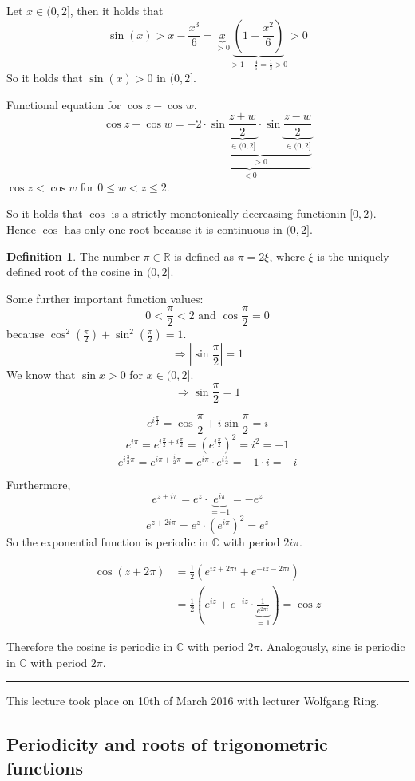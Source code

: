 \documentclass[a4paper,landscape,twocolumn]{article}
\theoremstyle{definition}
\newtheorem{defi}{Definition}
\newcommand\abs[1]{\left|#1\right|}
\newcommand\meta[3]{\hrule{} This #1 took place on #2 with lecturer #3.\par}
\begin{document}
Let $x \in (0,2]$, then it holds that
\[ \sin(x) > x - \frac{x^3}{6} = \underbrace{x}_{>0} \underbrace{\left(1 - \frac{x^2}{6}\right)}_{>1 - \frac46 = \frac13 > 0} > 0 \]
So it holds that $\sin(x) > 0$ in $(0,2]$.

Functional equation for $\cos{z} - \cos{w}$.
\[ \cos{z} - \cos{w} = \underbrace{-2  \cdot \underbrace{\sin{\underbrace{\frac{z+w}{2}}_{\in (0,2]}} \cdot \sin{\underbrace{\frac{z-w}{2}}_{\in (0,2]}}}_{>0}}_{<0} \]
$\cos{z} < \cos{w}$ for $0 \leq w < z \leq 2$.

So it holds that $\cos$ is a strictly monotonically decreasing functionin $[0,2)$. Hence $\cos$ has only one root because it is continuous in $(0,2]$.

\begin{defi}
  The number $\pi \in \mathbb R$ is defined as $\pi = 2\xi$, where $\xi$ is the uniquely defined root of the cosine in $(0,2]$.
\end{defi}

Some further important function values:
\[ 0 < \frac{\pi}{2} < 2 \text{ and } \cos{\frac\pi2} = 0 \]
because $\cos^2\left(\frac\pi2\right) + \sin^2\left(\frac\pi2\right) = 1$.
\[ \Rightarrow \abs{\sin\frac\pi2} = 1 \]
We know that $\sin{x} > 0$ for $x \in (0,2]$.
\[ \Rightarrow \sin\frac\pi2 = 1 \]

\[ e^{i \frac\pi2} = \cos\frac\pi2 + i \sin\frac\pi2 = i \]
\[ e^{i\pi} = e^{i\frac\pi2 + i\frac\pi2} = \left(e^{i\frac\pi2}\right)^2 = i^2 = -1 \]
\[ e^{i \frac32\pi} = e^{i\pi + \frac{i}2 \pi} = e^{i\pi} \cdot e^{i \frac\pi2} = -1 \cdot i = -i \]

Furthermore,
\[ e^{z + i\pi} = e^z \cdot \underbrace{e^{i\pi}}_{=-1} = -e^z \]
\[ e^{z + 2i\pi} = e^z \cdot \left(e^{i\pi}\right)^2 = e^z \]
So the exponential function is periodic in $\mathbb C$ with period $2i\pi$.

\begin{align*}
  \cos(z + 2\pi) &= \frac12 \left(e^{iz + 2\pi i} + e^{-iz - 2\pi i}\right) \\
    &= \frac12 \left(e^{iz} + e^{-iz} \cdot \underbrace{\frac1{e^{2\pi i}}}_{=1}\right) = \cos{z}
\end{align*}

Therefore the cosine is periodic in $\mathbb C$ with period $2\pi$.
Analogously, sine is periodic in $\mathbb C$ with period $2\pi$.

\meta{lecture}{10th of March 2016}{Wolfgang Ring}

\subsection{Periodicity and roots of trigonometric functions}
\end{document}
